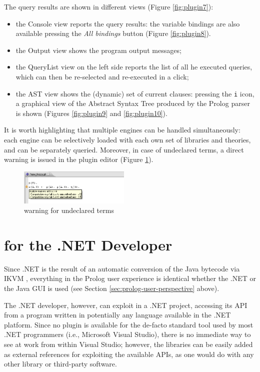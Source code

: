 The query results are shown in different views (Figure \ref{fig:plugin7}):
\begin{itemize}
  \item the \tuprolog{} Console view reports the query results: the variable bindings are also available pressing the \textit{All bindings} button (Figure \ref{fig:plugin8}).
  \item the Output view shows the program output messages;
  \item the QueryList view on the left side reports the list of all he executed queries, which can then be re-selected and re-executed in a click;
  \item the AST view shows the (dynamic) set of current clauses: pressing the \texttt{i} icon, a graphical view of the Abstract Syntax Tree produced by the Prolog parser is shown (Figures \ref{fig:plugin9} and \ref{fig:plugin10}).
\end{itemize}

It is worth highlighting that multiple \tuprolog{}  engines can be handled simultaneously: each engine can be selectively loaded with each own set of libraries and theories, and can be separately queried.
%
Moreover, in case of undeclared terms, a direct warning is issued in the plugin editor  (Figure \ref{fig:plugin11}).

\begin{figure}
  \includegraphics[width=200px]{images/plugin11.png}
  \caption{warning for undeclared terms}\label{fig:plugin11}
\end{figure}

\section{\tuprolog{} for the .NET Developer}
\label{sec:dotnet-user-perspective}

Since \tuprolog{}.NET is the result of an automatic conversion of the Java bytecode via IKVM \cite{ikvm}, everything in the Prolog user experience is identical whether the .NET or the Java GUI is used (see Section \ref{sec:prolog-user-perspective} above).

The .NET developer, however, can exploit \tuprolog{} in a .NET project, accessing its API from a program written in potentially any language available in the .NET platform.
%
Since no plugin is available for the de-facto standard tool used by most .NET programmers (i.e., Microsoft Visual Studio), there is no immediate way to see \tuprolog{} at work from within Visual Studio; however, the \tuprolog{} libraries can be easily added as external references for exploiting the available APIs, as one would do with any other library or third-party software.

